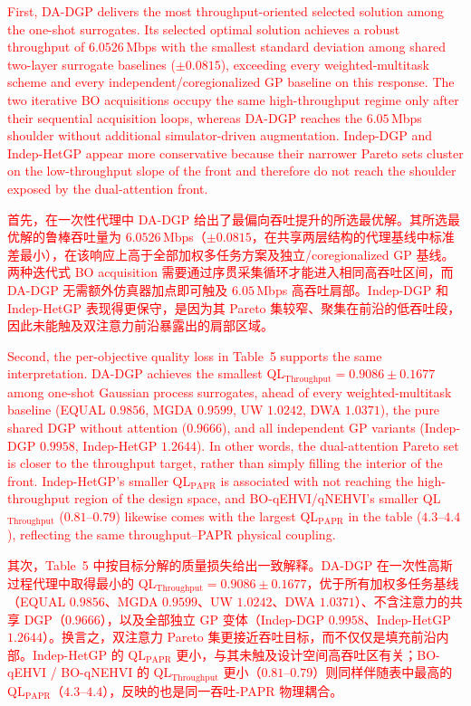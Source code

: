\documentclass[11pt]{article}
\begin{document}
\textcolor{red}{First, DA-DGP delivers the most throughput-oriented selected solution among the one-shot surrogates. Its selected optimal solution achieves a robust throughput of $6.0526$\,Mbps with the smallest standard deviation among shared two-layer surrogate baselines ($\pm 0.0815$), exceeding every weighted-multitask scheme and every independent/coregionalized GP baseline on this response. The two iterative BO acquisitions occupy the same high-throughput regime only after their sequential acquisition loops, whereas DA-DGP reaches the $6.05$\,Mbps shoulder without additional simulator-driven augmentation. Indep-DGP and Indep-HetGP appear more conservative because their narrower Pareto sets cluster on the low-throughput slope of the front and therefore do not reach the shoulder exposed by the dual-attention front.}%

\textcolor{red}{首先，在一次性代理中 DA-DGP 给出了最偏向吞吐提升的所选最优解。其所选最优解的鲁棒吞吐量为 $6.0526$\,Mbps（$\pm 0.0815$，在共享两层结构的代理基线中标准差最小），在该响应上高于全部加权多任务方案及独立/coregionalized GP 基线。两种迭代式 BO acquisition 需要通过序贯采集循环才能进入相同高吞吐区间，而 DA-DGP 无需额外仿真器加点即可触及 $6.05$\,Mbps 高吞吐肩部。Indep-DGP 和 Indep-HetGP 表现得更保守，是因为其 Pareto 集较窄、聚集在前沿的低吞吐段，因此未能触及双注意力前沿暴露出的肩部区域。}%

\textcolor{red}{Second, the per-objective quality loss in Table~5 supports the same interpretation. DA-DGP achieves the smallest QL$_{\text{Throughput}}=0.9086\pm0.1677$ among one-shot Gaussian process surrogates, ahead of every weighted-multitask baseline (EQUAL $0.9856$, MGDA $0.9599$, UW $1.0242$, DWA $1.0371$), the pure shared DGP without attention ($0.9666$), and all independent GP variants (Indep-DGP $0.9958$, Indep-HetGP $1.2644$). In other words, the dual-attention Pareto set is closer to the throughput target, rather than simply filling the interior of the front. Indep-HetGP's smaller QL$_{\text{PAPR}}$ is associated with not reaching the high-throughput region of the design space, and BO-qEHVI/qNEHVI's smaller QL$_{\text{Throughput}}$ ($0.81$--$0.79$) likewise comes with the largest QL$_{\text{PAPR}}$ in the table ($4.3$--$4.4$), reflecting the same throughput--PAPR physical coupling.}%

\textcolor{red}{其次，Table~5 中按目标分解的质量损失给出一致解释。DA-DGP 在一次性高斯过程代理中取得最小的 QL$_{\text{Throughput}}=0.9086\pm0.1677$，优于所有加权多任务基线（EQUAL $0.9856$、MGDA $0.9599$、UW $1.0242$、DWA $1.0371$）、不含注意力的共享 DGP（$0.9666$），以及全部独立 GP 变体（Indep-DGP $0.9958$、Indep-HetGP $1.2644$）。换言之，双注意力 Pareto 集更接近吞吐目标，而不仅仅是填充前沿内部。Indep-HetGP 的 QL$_{\text{PAPR}}$ 更小，与其未触及设计空间高吞吐区有关；BO-qEHVI / BO-qNEHVI 的 QL$_{\text{Throughput}}$ 更小（$0.81$--$0.79$）则同样伴随表中最高的 QL$_{\text{PAPR}}$（$4.3$--$4.4$），反映的也是同一吞吐-PAPR 物理耦合。}%
\end{document}
